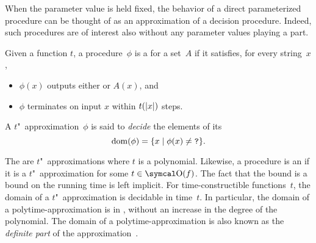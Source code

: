 When the parameter value is held fixed, the behavior of a direct parameterized procedure can be thought of as an approximation of a decision procedure.
Indeed, such procedures are of interest also without any parameter values playing a part.
\begin{definition}
\label{def:approximation}%
  Given a function $t$, a procedure~$\phi$ is a  for a set~$A$ if it satisfies, for every string~$x$,
  \begin{itemize}
  \item $\phi(x)$ outputs either  or $A(x)$, and
  \item $\phi$ terminates on input $x$ within $t({\lvert x\rvert})$ steps.
  \end{itemize}
  A $t$"~approximation~$\phi$ is said to \emph{decide} the elements of its 
  \begin{equation*}
    \operatorname{dom}(\phi) = \{x \;|\; \phi(x) \neq \textnormal{\texttt{?}}\}.
  \end{equation*}
\end{definition}

The  \parencite{ko1981completeness,balcazar1985bi-immune} are $t$"~approximations where $t$ is a polynomial.
Likewise, a procedure is an  if it is a $t$"~approximation for some $t \in \bigO(f)$.
The fact that the bound is a bound on the running time is left implicit.
For time-constructible functions~$t$, the domain of a $t$"~approximation is decidable in time~$t$.
In particular, the domain of a polytime-approximation is in , without an increase in the degree of the polynomial.
The domain of a polytime-approximation is also known as the \emph{definite part} of the approximation~\parencite{ko1981completeness}.

